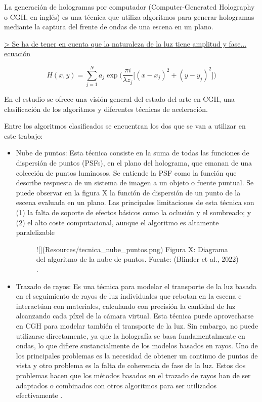 \documentclass[10pt, a4paper]{article}
\begin{document}
La generación de hologramas por computador (Computer-Generated Holography o CGH, en inglés) es una técnica que utiliza algoritmos para generar hologramas mediante la captura del frente de ondas de una escena en un plano. 

\underline{ > Se ha de tener en cuenta que la naturaleza de la luz tiene amplitud y fase... ecuación}

$$
H(x,y) = \sum\limits_{j=1}^N a_j\exp\Big(\frac{\pi i}{\lambda z_j}\big[(x-x_j)^2 + (y-y_j)^2 \big]\Big)
$$

En el estudio \cite{Blinder:2022} se ofrece una visión general del estado del arte en CGH, una clasificación de los algoritmos y diferentes técnicas de aceleración.

Entre los algoritmos clasificados se encuentran los dos que se van a utilizar en este trabajo:

\begin{itemize}
\item Nube de puntos: Esta técnica consiste en la suma de todas las funciones de dispersión de puntos (PSFs), en el plano del holograma, que emanan de una colección de puntos luminosos. Se entiende la PSF como la función que describe respuesta de un sistema de imagen a un objeto o fuente puntual. Se puede observar en la figura X la función de dispersión de un punto de la escena evaluada en un plano. Las principales limitaciones de esta técnica son (1) la falta de soporte de efectos básicos como la oclusión y el sombreado; y (2) el alto coste computacional, aunque el algoritmo es altamente paralelizable \cite{Blinder:2021}

\begin{figure}[h] 
![](Resources/tecnica_nube_puntos.png)
Figura X: Diagrama del algoritmo de la nube de puntos. Fuente: (Blinder et al., 2022) \cite{Blinder:2022}.
\end{figure}

\item Trazado de rayos: Es una técnica para modelar el transporte de la luz basada en el seguimiento de rayos de luz individuales que rebotan en la escena e interactúan con materiales, calculando con precisión la cantidad de luz alcanzando cada píxel de la cámara virtual. Esta técnica puede aprovecharse en CGH para modelar también el transporte de la luz. Sin embargo, no puede utilizarse directamente, ya que la holografía se basa fundamentalmente en ondas, lo que difiere sustancialmente de los modelos basados en rayos. Uno de los principales problemas es la necesidad de obtener un continuo de puntos de vista y otro problema es la falta de coherencia de fase de la luz. Estos dos problemas hacen que los métodos basados en el trazado de rayos han de ser adaptados o combinados con otros algoritmos para ser utilizados efectivamente \cite{Blinder:2022}.
\end{itemize}
\end{document}

